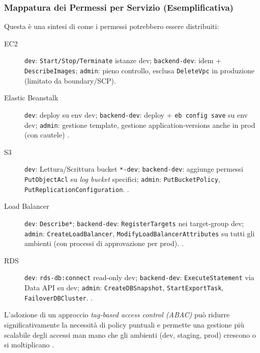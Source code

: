 \subsubsection{Mappatura dei Permessi per Servizio (Esemplificativa)}
\label{subsubsec:mappa_servizi_iam}
Questa è una sintesi di come i permessi potrebbero essere distribuiti:
\begin{description}
  \item[EC2] \texttt{dev}: \texttt{Start/Stop/Terminate} istanze dev; \texttt{backend‑dev}: idem + \texttt{DescribeImages}; \texttt{admin}: pieno controllo, esclusa \texttt{DeleteVpc} in produzione (limitato da boundary/SCP).  
  \item[Elastic Beanstalk] \texttt{dev}: deploy su env dev; \texttt{backend‑dev}: deploy + \texttt{eb config save} su env dev; \texttt{admin}: gestione template, gestione application‑versions anche in prod (con cautele) \cite{AWSEBRole}.  
  \item[S3] \texttt{dev}: Lettura/Scrittura bucket \texttt{*-dev}; \texttt{backend‑dev}: aggiunge permessi \texttt{PutObjectAcl} su \emph{log bucket} specifici; \texttt{admin}: \texttt{PutBucketPolicy}, \texttt{PutReplicationConfiguration}. \cite{AWSS3Security}.  
  \item[Load Balancer] \texttt{dev}: \texttt{Describe*}; \texttt{backend‑dev}: \texttt{RegisterTargets} nei target‑group dev; \texttt{admin}: \texttt{CreateLoadBalancer}, \texttt{ModifyLoadBalancerAttributes} su tutti gli ambienti (con processi di approvazione per prod). \cite{AWSELBIAM}.  
  \item[RDS] \texttt{dev}: \texttt{rds-db:connect} read‑only dev; \texttt{backend‑dev}: \texttt{ExecuteStatement} via Data API su dev; \texttt{admin}: \texttt{CreateDBSnapshot}, \texttt{StartExportTask}, \texttt{FailoverDBCluster}. \cite{AWSRDSIAM}.  
\end{description}
L'adozione di un approccio \emph{tag‑based access control (ABAC)} può ridurre significativamente la necessità di policy puntuali e permette una gestione più scalabile degli accessi man mano che gli ambienti (dev, staging, prod) crescono o si moltiplicano \cite{AWSEC2IAM,AWSELBIAM}.

